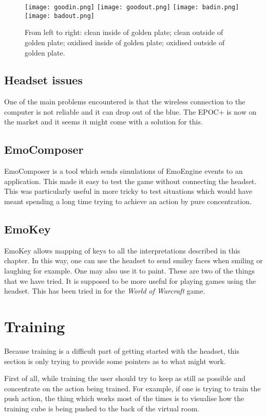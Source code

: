 \begin{figure}
  \centering
  \texttt{[image: goodin.png]} \texttt{[image: goodout.png]} \texttt{[image: badin.png]} \texttt{[image: badout.png]}
  \caption{From left to right: clean inside of golden plate; clean outside of golden plate; oxidised inside of golden plate; oxidised outside of golden plate.}
    \label{fig:cleanVsOxidised}           
\end{figure}

\subsection{Headset issues}
One of the main problems encountered is that the wireless connection to the computer is not reliable and it can drop out of the blue. The EPOC+ is now on the market and it seems it might come with a solution for this.

\subsection{EmoComposer}
\label{part:emocomposer}
EmoComposer is a tool which sends simulations of EmoEngine events to an application. This made it easy to test the game without connecting the headset. This was particularly useful in more tricky to test situations which would have meant spending a long time trying to achieve an action by pure concentration.

\subsection{EmoKey}
EmoKey allows mapping of keys to all the interpretations described in this chapter. In this way, one can use the headset to send smiley faces when smiling or laughing for example. One may also use it to paint. These are two of the things that we have tried. It is supposed to be more useful for playing games using the headset. This has been tried in \cite{wowControl} for the \textit{World of Warcraft} game.

\section{Training}
Because training is a difficult part of getting started with the headset, this section is only trying to provide some pointers as to what might work. 

First of all, while training the user should try to keep as still as possible and concentrate on the action being trained. For example, if one is trying to train the push action, the thing which works most of the times is to visualise how the training cube is being pushed to the back of the virtual room. 


